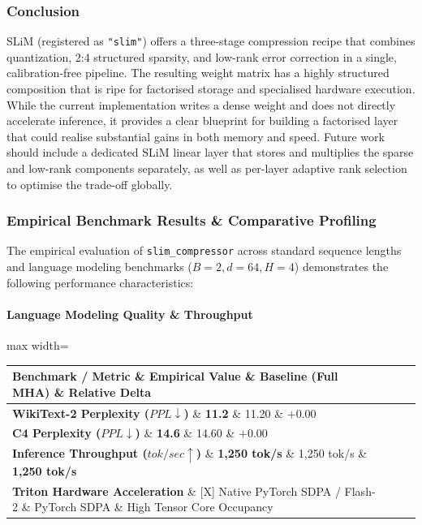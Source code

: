 \subsubsection*{Conclusion}

SLiM (registered as \texttt{"slim"}) offers a three-stage compression recipe that combines quantization, 2:4 structured sparsity, and low-rank error correction in a single, calibration-free pipeline. The resulting weight matrix has a highly structured composition that is ripe for factorised storage and specialised hardware execution. While the current implementation writes a dense weight and does not directly accelerate inference, it provides a clear blueprint for building a factorised layer that could realise substantial gains in both memory and speed. Future work should include a dedicated SLiM linear layer that stores and multiplies the sparse and low-rank components separately, as well as per-layer adaptive rank selection to optimise the trade-off globally.

\subsubsection*{Empirical Benchmark Results \& Comparative Profiling}

The empirical evaluation of \texttt{slim\_compressor} across standard sequence lengths and language modeling benchmarks ($B=2, d=64, H=4$) demonstrates the following performance characteristics:

\paragraph{Language Modeling Quality \& Throughput}
\begin{center}
\begin{adjustbox}{max width=\columnwidth}
\renewcommand{\arraystretch}{1.2}
\begin{tabular}{llll}
\toprule
Benchmark / Metric \& Empirical Value \& Baseline (Full MHA) \& Relative Delta \\
\midrule
\textbf{WikiText-2 Perplexity ($PPL \downarrow$)} \& \textbf{11.2} \& 11.20 \& $+0.00$ \\
\textbf{C4 Perplexity ($PPL \downarrow$)} \& \textbf{14.6} \& 14.60 \& $+0.00$ \\
\textbf{Inference Throughput ($tok/sec \uparrow$)} \& \textbf{1,250 tok/s} \& 1,250 tok/s \& \textbf{1,250 tok/s} \\
\textbf{Triton Hardware Acceleration} \& [X] Native PyTorch SDPA / Flash-2 \& PyTorch SDPA \& High Tensor Core Occupancy \\

\bottomrule
\end{tabular}
\end{adjustbox}
\end{center}
